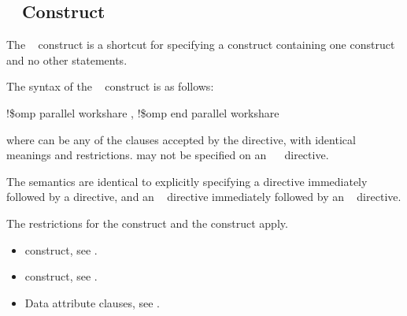 \vspace{3\baselineskip}
\fortranspecificstart
\vspace{-3\baselineskip}
\subsection{~ Construct}
\label{subsec:parallel workshare Construct}
\summary
The ~ construct is a shortcut for specifying a  
construct containing one  construct and no other statements.

\syntax
The syntax of the ~ construct is as follows:

\begin{boxedcode}
!\$omp parallel workshare \plc{[clause[ [},\plc{] clause] ... ]}
!\$omp end parallel workshare
\end{boxedcode}

where  can be any of the clauses accepted by the  directive, with 
identical meanings and restrictions.  may not be specified on an 
~~ directive.

\descr
The semantics are identical to explicitly specifying a  directive immediately 
followed by a  directive, and an ~ directive immediately 
followed by an ~ directive. 

\restrictions
The restrictions for the  construct and the  construct apply.

\crossreferences
\begin{itemize}
\item {} construct, see 
. 

\item {} construct, see 
.

\item Data attribute clauses, see 
.
\end{itemize}
\fortranspecificend










